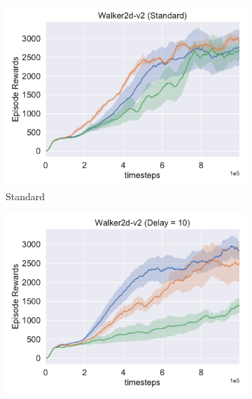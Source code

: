 
\begin{figure}[h!]
\centering
  \begin{subfigure}[t]{0.49\textwidth}
    \includegraphics[width=\textwidth]{figures/chapter5/multi_frames/delay1.pdf}
    \caption{Standard}
  \end{subfigure}\hfill
  \begin{subfigure}[t]{0.49\textwidth}
    \includegraphics[width=\textwidth]{figures/chapter5/multi_frames/delay10.pdf}

\end{subfigure}
\end{figure}
